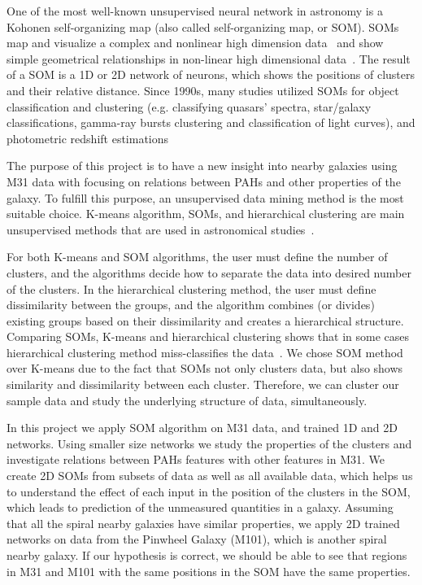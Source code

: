 One of the most well-known unsupervised neural network in astronomy is a Kohonen self-organizing map (also called self-organizing map, or SOM).
SOMs map and visualize a complex and nonlinear high dimension data~\citep{Kohonen82} and show simple geometrical relationships in non-linear high dimensional data~\citep{Kohonen98}.
The result of a SOM is a 1D or 2D network of neurons, which shows the positions of clusters and their relative distance.
Since 1990s, many studies utilized SOMs for object classification and clustering (e.g. classifying quasars' spectra, star/galaxy classifications, gamma-ray bursts clustering and classification of light curves), and photometric redshift estimations~\citep[e.g.][]{Odewahn92, Hernandez94, Murtagh95, Maehoenen95,Scaringi09,Geach12,Fustes13,Meusinger16,Rahmani16b} %

The purpose of this project is to have a new insight into nearby galaxies using M31 data with focusing on relations between PAHs and other properties of the galaxy.
To fulfill this purpose, an unsupervised data mining method is the most suitable choice. %
K-means algorithm, SOMs, and hierarchical clustering are main unsupervised methods that are used in astronomical studies~\citep[e.g.][]{DAbrusco12, Aycha16}. %

For both K-means and SOM algorithms, the user must define the number of clusters, and the algorithms decide how to separate the data into desired number of the clusters.
In the hierarchical clustering method, the user must define dissimilarity between the groups, and the algorithm combines (or divides) existing groups based on their dissimilarity and creates a hierarchical structure. 
Comparing SOMs, K-means and hierarchical clustering shows that in some cases hierarchical clustering method miss-classifies the data~\citep[][and references therein]{Mangiameli96}.
We chose SOM method over K-means due to the fact that SOMs not only clusters data, but also shows similarity and dissimilarity between each cluster.
Therefore, we can cluster our sample data and study the underlying structure of data, simultaneously.

In this project we apply SOM algorithm on M31 data, and trained 1D and 2D networks.
Using smaller size networks we study the properties of the clusters and investigate relations between PAHs features with other features in M31.
We create 2D SOMs from subsets of data as well as all available data, which helps us to understand the effect of each input in the position of the clusters in the SOM, which leads to prediction of the unmeasured quantities in a galaxy.
Assuming that all the spiral nearby galaxies have similar properties, we apply 2D trained networks on data from the Pinwheel Galaxy (M101), which is another spiral nearby galaxy. 
If our hypothesis is correct, we should be able to see that regions in M31 and M101 with the same positions in the SOM have the same properties.

